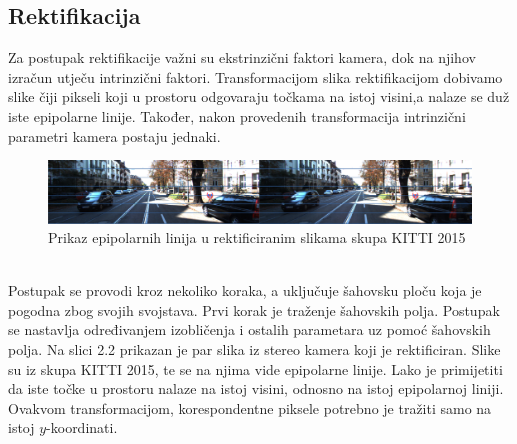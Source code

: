 \documentclass[times, utf8, zavrsni, numeric]{fer}
\begin{document}
\subsection{Rektifikacija}
Za postupak rektifikacije važni su ekstrinzični faktori kamera, dok na njihov izračun utječu intrinzični faktori. Transformacijom slika rektifikacijom dobivamo slike čiji pikseli koji u prostoru odgovaraju točkama na istoj visini,a nalaze se duž iste epipolarne linije. Također, nakon provedenih transformacija intrinzični parametri kamera postaju jednaki.\\
\begin{figure}[htb]
\centering
\includegraphics[width = 14.5cm]{img/slika3.png}
\caption{Prikaz epipolarnih linija u rektificiranim slikama skupa KITTI 2015}
\label{fig:Radial}
\end{figure}\\
Postupak se provodi kroz nekoliko koraka, a uključuje šahovsku ploču koja je pogodna zbog svojih svojstava. Prvi korak je traženje šahovskih polja. Postupak se nastavlja određivanjem izobličenja i ostalih parametara uz pomoć šahovskih polja.
Na slici 2.2 prikazan je par slika iz stereo kamera koji je rektificiran. Slike su iz skupa KITTI 2015, te se na njima vide epipolarne linije. Lako je primijetiti da iste točke u prostoru nalaze na istoj visini, odnosno na istoj epipolarnoj liniji. Ovakvom transformacijom, korespondentne piksele potrebno je tražiti samo na istoj $y$-koordinati.
\end{document}
